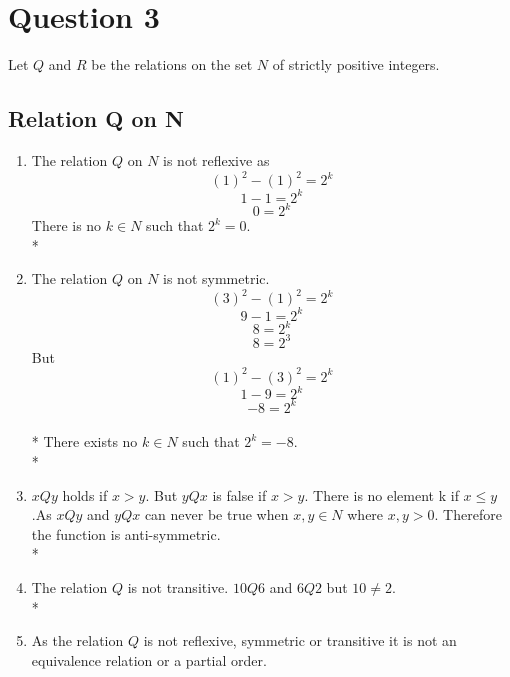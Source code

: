 \documentclass[a4paper,12pt]{article}
\begin{document}
\section{Question 3}
Let $Q$ and $R$ be the relations on the set $N$ of strictly positive integers.
\subsection{Relation Q on N}
\begin{enumerate} 
  \item    The relation $Q$ on $N$ is not reflexive as \[(1)^2 - (1)^2 = 2^k\]
\[1 - 1 = 2^k\]
\[0 = 2^k\]
There is no $k \in N$ such that $2^k = 0$.
\\*
\\
\item
  The relation $Q$ on $N$ is not symmetric. \[(3)^2 - (1)^2 = 2^k\]
\[9 -1 = 2^k\]
\[8 = 2^k\]
\[8 = 2^3\]
But \[(1)^2 - (3)^2 = 2^k\]
\[1 - 9 = 2^k\]
\[ -8 = 2^k \]
\\*
There exists no $k \in N$ such that $2^k = -8$.
\\*
\\
\item
  $xQy$ holds if $x > y$. But $yQx$ is false if $x > y$. There is no element k if $x \leq y$.As $xQy$ and $yQx$ can never be true when $x,y \in N$ where $x,y > 0$. Therefore the function is anti-symmetric.
\\* 
\\ 
\item
  The relation $Q$ is not transitive. $10Q6$ and $6Q2$ but $10 \not= 2$.
\\*
\\
\item
  As the relation $Q$ is not reflexive, symmetric or transitive it is not an equivalence 
relation or a partial order.
\end{enumerate}
\end{document}
